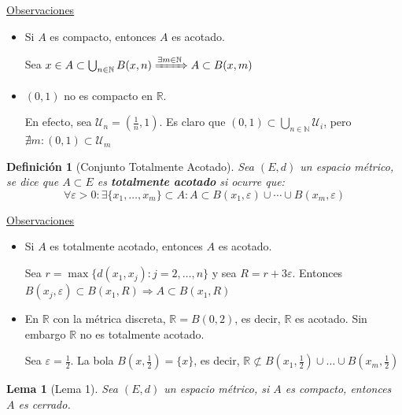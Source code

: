 \documentclass[10pt,a4paper,openright]{book}
\theoremstyle{break}
\newtheorem*{defi}{Definición}
\newtheorem*{lema}{Lema}
\begin{document}
\newpage
\underline{Observaciones}

\begin{itemize}
\item Si $A$ es compacto, entonces $A$ es acotado.

Sea $x \in A \subset \bigcup_{n \in \mathbb{N}} B(x,n) \xRightarrow{\exists m \in \mathbb{N}} A \subset B(x,m)$

\item $(0,1)$ no es compacto en $\mathbb{R}$.

En efecto, sea $\mathcal{U}_n = (\frac{1}{n}, 1)$. Es claro que $(0,1) \subset \bigcup_{n \in \mathbb{N}} \mathcal{U}_i$, pero $\nexists m : (0,1) \subset \mathcal{U}_m$
\end{itemize}

\begin{defi}[Conjunto Totalmente Acotado]
Sea $(E,d)$ un espacio métrico, se dice que $A \subset E$ es \textbf{totalmente acotado} si ocurre que:
$$\forall \varepsilon >0: \exists \{x_1, \ldots, x_m\} \subset A : A \subset B(x_1, \varepsilon) \cup \cdots \cup B(x_m, \varepsilon)$$
\end{defi}

\underline{Observaciones}

\begin{itemize}
\item Si $A$ es totalmente acotado, entonces $A$ es acotado.

Sea $r = \max\{d(x_1, x_j) : j = 2, \ldots, n\}$ y sea $R= r + 3 \varepsilon$. Entonces $B(x_j, \varepsilon) \subset B(x_1, R) \Rightarrow A \subset B(x_1, R)$

\item En $\mathbb{R}$ con la métrica discreta, $\mathbb{R} = B(0,2)$, es decir, $\mathbb{R}$ es acotado. Sin embargo $\mathbb{R}$ no es totalmente acotado.

Sea $\varepsilon = \frac{1}{2}$. La bola $B(x, \frac{1}{2}) = \{x\}$, es decir, $\mathbb{R} \not\subset B(x_1, \frac{1}{2}) \cup \ldots \cup B(x_m, \frac{1}{2})$
\end{itemize}

\begin{lema}[Lema 1]
Sea $(E,d)$ un espacio métrico, si $A$ es compacto, entonces $A$ es cerrado.
\end{lema}
\end{document}
